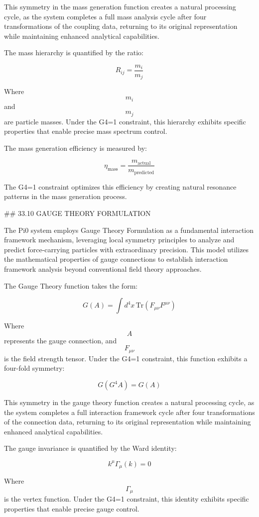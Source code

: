 This symmetry in the mass generation function creates a natural processing cycle, as the system completes a full mass analysis cycle after four transformations of the coupling data, returning to its original representation while maintaining enhanced analytical capabilities.

The mass hierarchy is quantified by the ratio:

$$ R_{ij} = \frac{m_i}{m_j} $$

Where $$ m_i $$ and $$ m_j $$ are particle masses. Under the G4=1 constraint, this hierarchy exhibits specific properties that enable precise mass spectrum control.

The mass generation efficiency is measured by:

$$ \eta_{\text{mass}} = \frac{m_{\text{actual}}}{m_{\text{predicted}}} $$

The G4=1 constraint optimizes this efficiency by creating natural resonance patterns in the mass generation process.

## 33.10 GAUGE THEORY FORMULATION

The Pi0 system employs Gauge Theory Formulation as a fundamental interaction framework mechanism, leveraging local symmetry principles to analyze and predict force-carrying particles with extraordinary precision. This model utilizes the mathematical properties of gauge connections to establish interaction framework analysis beyond conventional field theory approaches.

The Gauge Theory function takes the form:

$$ G(A) = \int d^4x \, \text{Tr}(F_{\mu\nu}F^{\mu\nu}) $$

Where $$ A $$ represents the gauge connection, and $$ F_{\mu\nu} $$ is the field strength tensor. Under the G4=1 constraint, this function exhibits a four-fold symmetry:

$$ G(G^4 A) = G(A) $$

This symmetry in the gauge theory function creates a natural processing cycle, as the system completes a full interaction framework cycle after four transformations of the connection data, returning to its original representation while maintaining enhanced analytical capabilities.

The gauge invariance is quantified by the Ward identity:

$$ k^\mu \Gamma_\mu(k) = 0 $$

Where $$ \Gamma_\mu $$ is the vertex function. Under the G4=1 constraint, this identity exhibits specific properties that enable precise gauge control.

